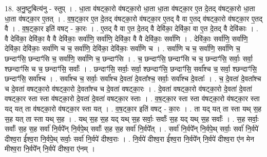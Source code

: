 \documentclass[17pt]{extarticle}
\begin{document}
18. अ॒नु॒ष्टुबित्य॑नु - स्तुप् । . धा॒ता व॑षट्का॒रो व॑षट्का॒रो धा॒ता धा॒ता व॑षट्का॒र ए॒त दे॒तद् व॑षट्का॒रो धा॒ता धा॒ता व॑षट्का॒र ए॒तत् । . व॒ष॒ट्का॒र ए॒त दे॒तद् व॑षट्का॒रो व॑षट्का॒र ए॒तद् वै वा ए॒तद् व॑षट्का॒रो व॑षट्का॒र ए॒तद् वै । . व॒ष॒ट्का॒र इति॑ वषट् - का॒रः । . ए॒तद् वै वा ए॒त दे॒तद् वै देवि॑का॒ देवि॑का॒ वा ए॒त दे॒तद् वै देवि॑काः । . वै देवि॑का॒ देवि॑का॒ वै वै देवि॑काः॒ सर्वा॑णि॒ सर्वा॑णि॒ देवि॑का॒ वै वै देवि॑काः॒ सर्वा॑णि । . देवि॑काः॒ सर्वा॑णि॒ सर्वा॑णि॒ देवि॑का॒ देवि॑काः॒ सर्वा॑णि च च॒ सर्वा॑णि॒ देवि॑का॒ देवि॑काः॒ सर्वा॑णि च । . सर्वा॑णि च च॒ सर्वा॑णि॒ सर्वा॑णि च॒ छन्दाꣳ॑सि॒ छन्दाꣳ॑सि च॒ सर्वा॑णि॒ सर्वा॑णि च॒ छन्दाꣳ॑सि । . च॒ छन्दाꣳ॑सि॒ छन्दाꣳ॑सि च च॒ छन्दाꣳ॑सि॒ सर्वाः॒ सर्वा॒ श्छन्दाꣳ॑सि च च॒ छन्दाꣳ॑सि॒ सर्वाः᳚ । . छन्दाꣳ॑सि॒ सर्वाः॒ सर्वा॒ श्छन्दाꣳ॑सि॒ छन्दाꣳ॑सि॒ सर्वा᳚श्च च॒ सर्वा॒ श्छन्दाꣳ॑सि॒ छन्दाꣳ॑सि॒ सर्वा᳚श्च । . सर्वा᳚श्च च॒ सर्वाः॒ सर्वा᳚श्च दे॒वता॑ दे॒वता᳚श्च॒ सर्वाः॒ सर्वा᳚श्च दे॒वताः᳚ । . च॒ दे॒वता॑ दे॒वता᳚श्च च दे॒वता॑ वषट्का॒रो व॑षट्का॒रो दे॒वता᳚श्च च दे॒वता॑ वषट्का॒रः । . दे॒वता॑ वषट्का॒रो व॑षट्का॒रो दे॒वता॑ दे॒वता॑ वषट्का॒र स्ता स्ता व॑षट्का॒रो दे॒वता॑ दे॒वता॑ वषट्का॒र स्ताः । . व॒ष॒ट्का॒र स्ता स्ता व॑षट्का॒रो व॑षट्का॒र स्ता यद् यत् ता व॑षट्का॒रो व॑षट्का॒र स्ता यत् । . व॒ष॒ट्का॒र इति॑ वषट् - का॒रः । . ता यद् यत् ता स्ता यथ् स॒ह स॒ह यत् ता स्ता यथ् स॒ह । . यथ् स॒ह स॒ह यद् यथ् स॒ह सर्वाः॒ सर्वाः᳚ स॒ह यद् यथ् स॒ह सर्वाः᳚ । . स॒ह सर्वाः॒ सर्वाः᳚ स॒ह स॒ह सर्वा॑ नि॒र्वपे᳚न् नि॒र्वपे॒थ् सर्वाः᳚ स॒ह स॒ह सर्वा॑ नि॒र्वपे᳚त् । . सर्वा॑ नि॒र्वपे᳚न् नि॒र्वपे॒थ् सर्वाः॒ सर्वा॑ नि॒र्वपे॑ दीश्व॒रा ई᳚श्व॒रा नि॒र्वपे॒थ् सर्वाः॒ सर्वा॑ 
नि॒र्वपे॑ दीश्व॒राः । . नि॒र्वपे॑ दीश्व॒रा ई᳚श्व॒रा नि॒र्वपे᳚न् नि॒र्वपे॑ दीश्व॒रा ए॑न मेन मीश्व॒रा नि॒र्वपे᳚न् नि॒र्वपे॑ दीश्व॒रा ए॑नम् । \newline
\end{document}
